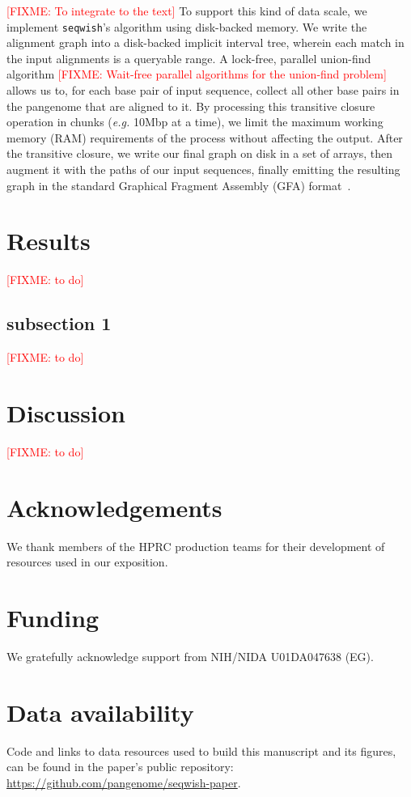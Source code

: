 \documentclass{bioinfo}
\newcommand{\red}[1]{{\textcolor{Red}{#1}}}
\newcommand{\FIXME}[1]{\red{[FIXME: #1]}}
\begin{document}
    \FIXME{To integrate to the text}
    To support this kind of data scale, we implement \texttt{seqwish}'s algorithm using disk-backed memory.
    We write the alignment graph into a disk-backed implicit interval tree, wherein each match in the input alignments is a queryable range.
    A lock-free, parallel union-find algorithm \FIXME{Wait-free parallel algorithms for the union-find problem} allows us to, for each base pair of input sequence, collect all other base pairs in the pangenome that are aligned to it.
    By processing this transitive closure operation in chunks (\textit{e.g.} 10Mbp at a time), we limit the maximum working memory (RAM) requirements of the process without affecting the output.
    After the transitive closure, we write our final graph on disk in a set of arrays, then augment it with the paths of our input sequences,
    finally emitting the resulting graph in the standard Graphical Fragment Assembly (GFA) format~\citep{GFA}.


    \section{Results}
    \label{sec:results}
    \FIXME{to do}

    \subsection{subsection 1}
    \label{subsec:subsec1}
    \FIXME{to do}


    \section{Discussion}
    \label{sec:discussion}
    \FIXME{to do}

    \section*{Acknowledgements}

    We thank members of the HPRC production teams for their development of resources used in our exposition.

    \section*{Funding}

    We gratefully acknowledge support from NIH/NIDA U01DA047638 (EG).

    \section*{Data availability}

    Code and links to data resources used to build this manuscript and its figures, can be found in the paper's public repository: \url{https://github.com/pangenome/seqwish-paper}.

    

    
\end{document}
